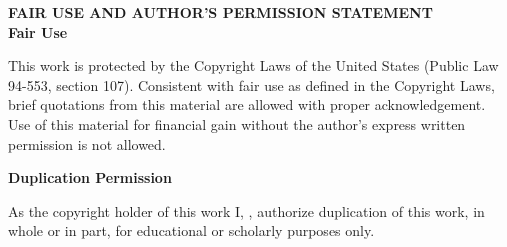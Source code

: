 \thispagestyle{empty}

\begin{center}
    \textbf{FAIR USE AND AUTHOR'S PERMISSION STATEMENT}
    \\[0.2in]
    \textbf{Fair Use}
\end{center}
\begin{flushleft}
    \singlespacing
    This work is protected by the Copyright Laws of the United States (Public Law 94-553, section 107). Consistent with fair use as defined in the Copyright Laws, brief quotations from this material are allowed with proper acknowledgement. Use of this material for financial gain without the author's express written permission is not allowed.
\end{flushleft}
\begin{center}
    \textbf{Duplication Permission}
\end{center}
\begin{flushleft}
    \singlespacing
    As the copyright holder of this work I, \myName, authorize duplication of this work, in whole or in part, for educational or scholarly purposes only. \\
\end{flushleft}
